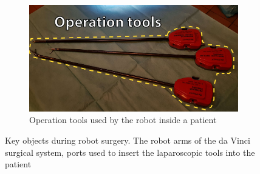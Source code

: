 \documentclass[conference]{IEEEtran}
\begin{document}
\begin{figure}
	\begin{subfigure}[b]{0.48\textwidth}
		\includegraphics[width=\textwidth]{Figures/tools.pdf}
		\caption{Operation tools used by the robot inside a patient}
		\label{fig:tools}
	\end{subfigure}
	\caption{Key objects during robot surgery. The robot arms of the da Vinci surgical system, ports used to insert the laparoscopic tools into the patient}
	\label{Fig:fieldresult}
\end{figure}
\end{document}
